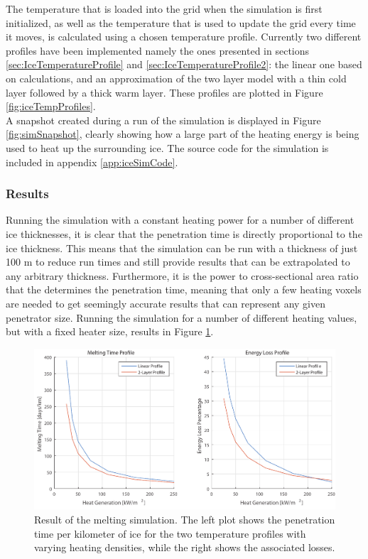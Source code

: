 \noindent
The temperature that is loaded into the grid when the simulation is first initialized, as well as the temperature that is used to update the grid every time it moves, is calculated using a chosen temperature profile. Currently two different profiles have been implemented namely the ones presented in sections \ref{sec:IceTemperatureProfile} and \ref{sec:IceTemperatureProfile2}: the linear one based on calculations, and an approximation of the two layer model with a thin cold layer followed by a thick warm layer. These profiles are plotted in Figure \ref{fig:iceTempProfiles}.\\

\noindent 
A snapshot created during a run of the simulation is displayed in Figure \ref{fig:simSnapshot}, clearly showing how a large part of the heating energy is being used to heat up the surrounding ice. The source code for the simulation is included in appendix \ref{app:iceSimCode}.


\subsubsection{Results}
Running the simulation with a constant heating power for a number of different ice thicknesses, it is clear that the penetration time is directly proportional to the ice thickness. This means that the simulation can be run with a thickness of just 100 m to reduce run times and still provide results that can be extrapolated to any arbitrary thickness. Furthermore, it is the power to cross-sectional area ratio that the determines the penetration time, meaning that only a few heating voxels are needed to get seemingly accurate results that can represent any given penetrator size. Running the simulation for a number of different heating values, but with a fixed heater size, results in Figure \ref{fig:simResults}.

\begin{figure}[ht]
	\centering
	\includegraphics[width=.9\textwidth]{figures/LAMC/simResult.pdf}
	\caption{Result of the melting simulation. The left plot shows the penetration time per kilometer of ice for the two temperature profiles with varying heating densities, while the right shows the associated losses.}
	\label{fig:simResults}
\end{figure}

